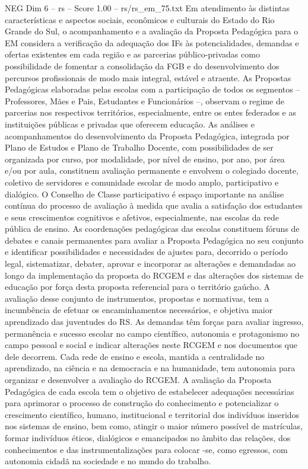 \begin{textsample}{NEG Dim 6 – rs – Score 1.00 – rs/rs\_em\_75.txt}
Em atendimento às distintas características e aspectos sociais, econômicos e culturais do Estado do Rio Grande do Sul, o acompanhamento e a avaliação da Proposta Pedagógica para o EM considera a verificação da adequação dos IFs às potencialidades, demandas e ofertas existentes em cada região e as parcerias público-privadas como possibilidade de fomentar a consolidação da FGB e do desenvolvimento dos percursos profissionais de modo mais integral, estável e atraente.
As Propostas Pedagógicas elaboradas pelas escolas com a participação de todos os segmentos – Professores, Mães e Pais, Estudantes e Funcionários –, observam o regime de parcerias nos respectivos territórios, especialmente, entre os entes federados e as instituições públicas e privadas que oferecem educação.
As análises e acompanhamentos do desenvolvimento da Proposta Pedagógica, integrada por Plano de Estudos e Plano de Trabalho Docente, com possibilidades de ser organizada por curso, por modalidade, por nível de ensino, por ano, por área e/ou por aula, constituem avaliação permanente e envolvem o colegiado docente, coletivo de servidores e comunidade escolar de modo amplo, participativo e dialógico.
O Conselho de Classe participativo é espaço importante na análise contínua do processo de avaliação à medida que avalia a satisfação dos estudantes e seus crescimentos cognitivos e afetivos, especialmente, nas escolas da rede pública de ensino.
As coordenações pedagógicas das escolas constituem fóruns de debates e canais permanentes para avaliar a Proposta Pedagógica no seu conjunto e identificar possibilidades e necessidades de ajustes para, decorrido o período legal, sistematizar, debater, aprovar e incorporar as alterações e demandadas ao longo da implementação da proposta do RCGEM e das alterações dos sistemas de educação por força desta proposta referencial para o território gaúcho.
A avaliação desse conjunto de instrumentos, propostas e normativas, tem a incumbência de efetuar os encaminhamentos necessários, e objetiva maior aprendizado das juventudes do RS.
As demandas têm forças para avaliar ingresso, permanência e sucesso escolar no campo científico, autonomia e protagonismo no campo pessoal e social e indicar alterações neste RCGEM e nos documentos que dele decorrem.
Cada rede de ensino e escola, mantida a centralidade no aprendizado, na ciência e na democracia e na humanidade, tem autonomia para organizar e desenvolver a avaliação do RCGEM.
A avaliação da Proposta Pedagógica de cada escola tem o objetivo de estabelecer adequações necessárias para aprimorar o processo de construção do conhecimento e potencializar o crescimento científico, humano, institucional e territorial dos indivíduos inseridos nos sistemas de ensino, bem como, atingir o maior número possível de matrículas, formar indivíduos éticos, dialógicos e emancipados no âmbito das relações, dos conhecimentos e das instrumentalizações para colocar -se, como egressos, com autonomia cidadã na sociedade e no mundo do trabalho.

\end{textsample}

